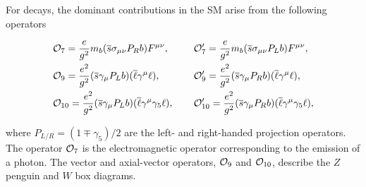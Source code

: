 For \btosll decays, the dominant contributions in the SM arise from the following operators~\cite{operators}

\begin{alignat}{2}
&{\mathcal{O}}_{7} = \frac{e}{g^{2}}m_{{b}}({\overline {{s}}}\sigma_{\mu\nu}P_{R}{b})F^{\mu\nu},~~~~~&&{\mathcal{O}}_{7}^{\prime} = \frac{e}{g^{2}}m_{{b}}({\overline {{s}}}\sigma_{\mu\nu}P_{L}{b})F^{\mu\nu}, \nonumber \\
&{\mathcal{O}}_{9} = \frac{e^{2}}{g^{2}}({\overline {{s}}}\gamma_{\mu}P_{L}{b})({\overline \ell}\gamma^{\mu}\ell), &&{\mathcal{O}}_{9}^{\prime} = \frac{e^{2}}{g^{2}}({\overline {{s}}}\gamma_{\mu}P_{R}{b})({\overline \ell}\gamma^{\mu}\ell),\\
&{\mathcal{O}}_{10} = \frac{e^{2}}{g^{2}}({\overline {{s}}}\gamma_{\mu}P_{L}{b})({\overline \ell}\gamma^{\mu}\gamma_{5}\ell), &&{\mathcal{O}}_{10}^{\prime} = \frac{e^{2}}{g^{2}}({\overline {{s}}}\gamma_{\mu}P_{R}{b})({\overline \ell}\gamma^{\mu}\gamma_{5}\ell), \nonumber
\end{alignat}

\noindent where $P_{L/R} = (1\mp\gamma_{5})/2$ are the left- and right-handed projection operators. The operator ${\mathcal{O}}_{7}$ is the electromagnetic operator corresponding to the emission of a photon. The vector and axial-vector operators, ${\mathcal{O}}_{9}$ and ${\mathcal{O}}_{10}$, describe the $Z$ penguin and $W$ box diagrams.

